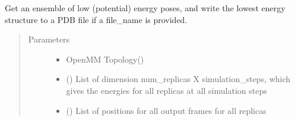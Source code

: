 \documentclass[letterpaper,12pt,english,openany,oneside]{sphinxmanual}
\begin{document}
\label{\detokenize{simulation:module-simulation.rep_exch}}

\begin{fulllineitems}
\label{\detokenize{simulation:simulation.rep_exch.get_minimum_energy_ensemble}}
Get an ensemble of low (potential) energy poses, and write the lowest energy structure to a PDB file if a file\_name is provided.
\begin{quote}\begin{description}
\item[{Parameters}] \leavevmode\begin{itemize}
\item {} 
 \textendash{} OpenMM Topology()

\item {} 
 (\sphinxstyleliteralemphasis{\sphinxupquote{( }}\sphinxstyleliteralemphasis{\sphinxupquote{( }}\sphinxstyleliteralemphasis{\sphinxupquote{ ) }}\sphinxstyleliteralemphasis{\sphinxupquote{ )}}) \textendash{} List of dimension num\_replicas X simulation\_steps, which gives the energies for all replicas at all simulation steps

\item {} 
 (\sphinxstyleliteralemphasis{\sphinxupquote{( }}\sphinxstyleliteralemphasis{\sphinxupquote{( }}\sphinxstyleliteralemphasis{\sphinxupquote{ ) }}\sphinxstyleliteralemphasis{\sphinxupquote{ )}}) \textendash{} List of positions for all output frames for all replicas


\end{itemize}
\end{description}
\end{quote}
\end{fulllineitems}
\end{document}
